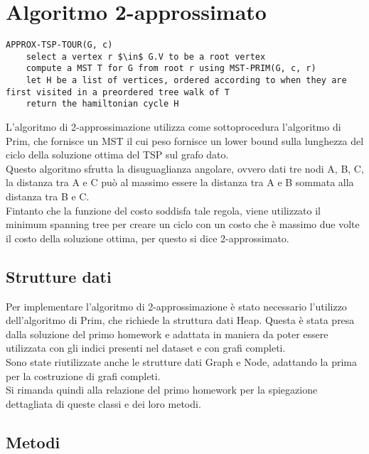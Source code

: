 \section{Algoritmo 2-approssimato}\label{two_approx}

\begin{lstlisting}[mathescape=true]
APPROX-TSP-TOUR(G, c)
	select a vertex r $\in$ G.V to be a root vertex
	compute a MST T for G from root r using MST-PRIM(G, c, r)
	let H be a list of vertices, ordered according to when they are first visited in a preordered tree walk of T
	return the hamiltonian cycle H
\end{lstlisting}	

L'algoritmo di 2-approssimazione utilizza come sottoprocedura l'algoritmo di Prim, che fornisce un MST il cui peso fornisce un lower bound sulla lunghezza del ciclo della soluzione ottima del TSP sul grafo dato.\\
Questo algoritmo sfrutta la disuguaglianza angolare, ovvero dati tre nodi A, B, C, la distanza tra A e C può al massimo essere la distanza tra A e B sommata alla distanza tra B e C.\\
Fintanto che la funzione del costo soddisfa tale regola, viene utilizzato il minimum spanning tree per creare un ciclo con un costo che è massimo due volte il costo della soluzione ottima, per questo si dice 2-approssimato.

\subsection{Strutture dati}

	Per implementare l'algoritmo di 2-approssimazione è stato necessario l'utilizzo dell'algoritmo di Prim, che richiede la struttura dati Heap.
	Questa è stata presa dalla soluzione del primo homework e adattata in maniera da poter essere utilizzata con gli indici presenti nel dataset e con grafi completi.\\
	Sono state riutilizzate anche le strutture dati Graph e Node, adattando la prima per la costruzione di grafi completi.\\
	Si rimanda quindi alla relazione del primo homework per la spiegazione dettagliata di queste classi e dei loro metodi.
	
\subsection{Metodi}
	
